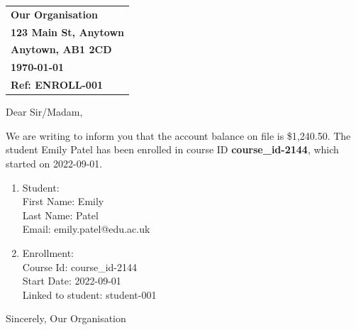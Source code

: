 \documentclass{article}
\begin{document}
\begin{tabular}{@{}l@{}}
  \textbf{Our Organisation} \\
  \textbf{123 Main St, Anytown} \\
  \textbf{Anytown, AB1 2CD} \\
  \textbf{\today} \\
  \textbf{Ref: ENROLL-001}
\end{tabular}

Dear Sir/Madam,

We are writing to inform you that the account balance on file is \$1,240.50.
The student Emily Patel has been enrolled in course ID \textbf{course\_id-2144}, which started on 2022-09-01.

\begin{enumerate}[noitemsep]
    \item Student: \\
        First Name: Emily \\
        Last Name: Patel \\
        Email: emily.patel@edu.ac.uk
    \item Enrollment: \\
        Course Id: course\_id-2144 \\
        Start Date: 2022-09-01 \\
        Linked to student: student-001
\end{enumerate}

Sincerely,
Our Organisation
\end{document}
